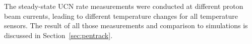 The steady-state UCN rate measurements were conducted at different
proton beam currents, leading to different temperature changes for all
temperature sensors. The result of all those measurements and
comparison to simulations is discussed in Section~\ref{sec:pentrack}.










